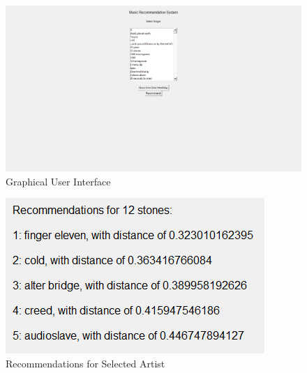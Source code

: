 \documentclass[paper=a4, fontsize=12pt]{scrartcl}
\numberwithin{equation}{section}		%
\numberwithin{figure}{section}			%
\numberwithin{table}{section}				%
\begin{document}
\begin{figure}[H]

\begin{center}

\includegraphics[scale=.4]{gui.png}

 \end{center}

  \caption{Graphical User Interface}

  \label{fig:}
\end{figure}  

\begin{figure}[H]

\begin{center}

\includegraphics[scale=.8]{recommendations.png}

 \end{center}

  \caption{Recommendations for Selected Artist}

  \label{fig:}
\end{figure} 
 
\end{document}
